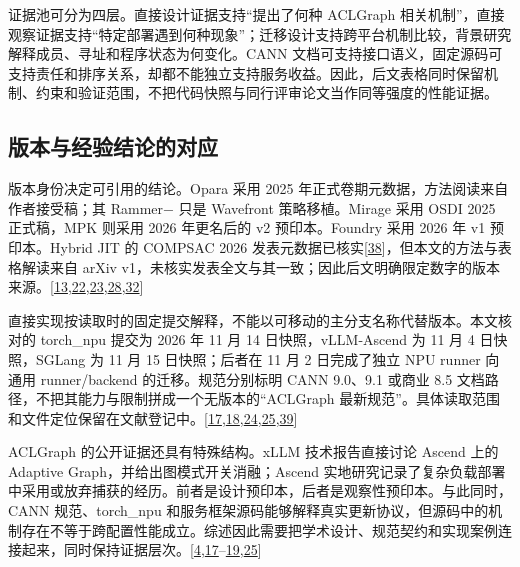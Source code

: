 \documentclass[
  UTF8,
  zihao=5]{ctexart}
\begin{document}
证据池可分为四层。直接设计证据支持``提出了何种 ACLGraph
相关机制''，直接观察证据支持``特定部署遇到何种现象''；迁移设计支持跨平台机制比较，背景研究解释成员、寻址和程序状态为何变化。CANN
文档可支持接口语义，固定源码可支持责任和排序关系，却都不能独立支持服务收益。因此，后文表格同时保留机制、约束和验证范围，不把代码快照与同行评审论文当作同等强度的性能证据。

\hypertarget{ux7248ux672cux4e0eux7ecfux9a8cux7ed3ux8bbaux7684ux5bf9ux5e94}{%
\subsection*{版本与经验结论的对应}\label{ux7248ux672cux4e0eux7ecfux9a8cux7ed3ux8bbaux7684ux5bf9ux5e94}}

版本身份决定可引用的结论。Opara 采用 2025
年正式卷期元数据，方法阅读来自作者接受稿；其 Rammer− 只是 Wavefront
策略移植。Mirage 采用 OSDI 2025 正式稿，MPK 则采用 2026 年更名后的 v2
预印本。Foundry 采用 2026 年 v1 预印本。Hybrid JIT 的 COMPSAC 2026
发表元数据已核实{[}\protect\hyperlink{ref-yadav2026hybrid}{38}{]}，但本文的方法与表格解读来自
arXiv
v1，未核实发表全文与其一致；因此后文明确限定数字的版本来源。{[}\protect\hyperlink{ref-wu2025mirage}{13},\protect\hyperlink{ref-yadav2026hybridpreprint}{22},\protect\hyperlink{ref-liu2026foundry}{23},\protect\hyperlink{ref-cheng2026mpk}{28},\protect\hyperlink{ref-chen2025opara}{32}{]}

直接实现按读取时的固定提交解释，不能以可移动的主分支名称代替版本。本文核对的
torch\_npu 提交为 2026 年 11 月 14 日快照，vLLM-Ascend 为 11 月 4
日快照，SGLang 为 11 月 15 日快照；后者在 11 月 2 日完成了独立 NPU
runner 向通用 runner/backend 的迁移。规范分别标明 CANN 9.0、9.1 或商业
8.5 文档路径，不把其能力与限制拼成一个无版本的``ACLGraph
最新规范''。具体读取范围和文件定位保留在文献登记中。{[}\protect\hyperlink{ref-vllmascend2026impl}{17},\protect\hyperlink{ref-sglang2026impl}{18},\protect\hyperlink{ref-cann850updateapi}{24},\protect\hyperlink{ref-torchnpu2026graphs}{25},\protect\hyperlink{ref-sglang2026refactor}{39}{]}

ACLGraph 的公开证据还具有特殊结构。xLLM 技术报告直接讨论 Ascend 上的
Adaptive Graph，并给出图模式开关消融；Ascend
实地研究记录了复杂负载部署中采用或放弃捕获的经历。前者是设计预印本，后者是观察性预印本。与此同时，CANN
规范、torch\_npu
和服务框架源码能够解释真实更新协议，但源码中的机制存在不等于跨配置性能成立。综述因此需要把学术设计、规范契约和实现案例连接起来，同时保持证据层次。{[}\protect\hyperlink{ref-liu2025xllm}{4},\protect\hyperlink{ref-vllmascend2026impl}{17}--\protect\hyperlink{ref-yu2026ascendfield}{19},\protect\hyperlink{ref-torchnpu2026graphs}{25}{]}
\end{document}
